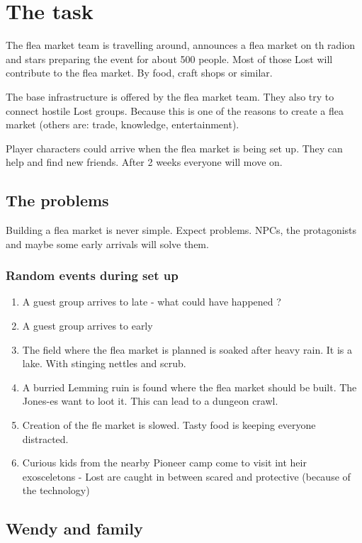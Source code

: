 \chapter{The task}

The flea market team is travelling around, announces a flea market on th radion and stars preparing the event for about 500 people. Most of those Lost will contribute to the flea market. By food, craft shops or similar.

The base infrastructure is offered by the flea market team. They also try to connect hostile Lost groups. Because this is one of the reasons to create a flea market (others are: trade, knowledge, entertainment).

Player characters could arrive when the flea market is being set up. They can help and find new friends. After 2 weeks everyone will move on.

\section{The problems}

Building a flea market is never simple. Expect problems. NPCs, the protagonists and maybe some early arrivals will solve them.


\subsection{Random events during set up}

\begin{enumerate}
\item A guest group arrives to late - what could have happened ?
\item A guest group arrives to early
\item The field where the flea market is planned is soaked after heavy rain. It is a lake. With stinging nettles and scrub.
\item A burried Lemming ruin is found where the flea market should be built. The Jones-es want to loot it. This can lead to a dungeon crawl.
\item Creation of the fle market is slowed. Tasty food is keeping everyone distracted.
\item Curious kids from the nearby Pioneer camp come to visit int heir exosceletons - Lost are caught in between scared and protective (because of the technology)
\end{enumerate}

\section{Wendy and family}

